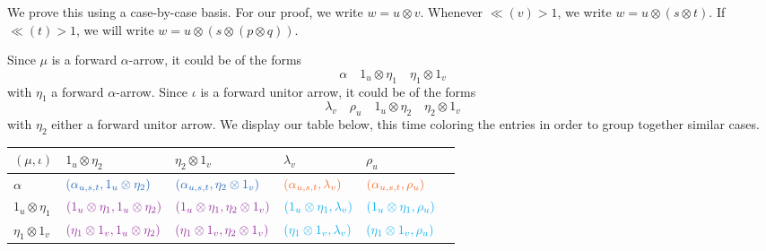 \begin{varprf}
    We prove this using a case-by-case basis. For our proof, we write 
    $w = u \otimes v$. Whenever $\ll(v) > 1$, we write $w = u\otimes (s \otimes t)$. 
    If $\ll(t) > 1$, we will write $w = u\otimes(s \otimes (p \otimes q))$. 

    Since $\mu$ is a forward $\alpha$-arrow, it could be of the forms 
    \[
        \alpha \quad 1_u \otimes \eta_1 \quad \eta_1\otimes 1_v
    \]
    with $\eta_1$ a forward $\alpha$-arrow. Since $\iota$ 
    is a forward unitor arrow, it could be of the forms 
    \[
        \lambda_v \quad \rho_u \quad 1_u \otimes \eta_2 \quad \eta_2\otimes 1_v
    \]
    with $\eta_2$ either a forward unitor arrow. 
    We display our table below, this time coloring the entries 
    in order to group together similar cases.
    
    \begin{center}
        \begin{tabular}{ p{1.2cm} |p{3cm} p{3cm} p{3cm} p{2cm} p{2cm}  }
            $(\mu,\iota)$
            &
            $1_u\otimes \eta_2$
            &
            $\eta_2 \otimes 1_v$
            & 
            $\lambda_v$
            &
            $\rho_u$
            \\[0.2cm]
            \hline
            $\alpha$
            & $\textcolor{NavyBlue}{(\alpha_{u,s,t},1_u \otimes \eta_2)}$ 
            & $\textcolor{NavyBlue}{(\alpha_{u,s,t}, \eta_2\otimes 1_v)}$
            & 
            $\textcolor{Orange}{(\alpha_{u,s,t}, \lambda_v)}$ 
            &
            $\textcolor{Orange}{(\alpha_{u,s,t}, \rho_u)}$
            \\[0.2cm]
            $1_u \otimes \eta_1$
            & $\textcolor{Purple}{(1_u \otimes \eta_1 ,1_u \otimes \eta_2)}$ 
            & $\textcolor{Purple}{(1_u \otimes \eta_1, \eta_2\otimes 1_v)}$
            & 
            $\textcolor{ProcessBlue}{(1_u\otimes\eta_1 ,\lambda_v)}$ 
            &
            $\textcolor{ProcessBlue}{(1_u\otimes\eta_1 ,\rho_u)}$
            \\[0.2cm]
            $\eta_1\otimes 1_v$
            & $\textcolor{Purple}{(\eta_1\otimes 1_v ,1_u \otimes \eta_2)}$ 
            & $\textcolor{Purple}{(\eta_1\otimes 1_v, \eta_2\otimes 1_v)}$
            & 
            $ \textcolor{ProcessBlue}{(\eta_1\otimes 1_v, \lambda_v)}$ 
            &
            $\textcolor{ProcessBlue}{(\eta_1\otimes 1_v, \rho_u)}$
        \end{tabular}
    \end{center}


\end{varprf}
